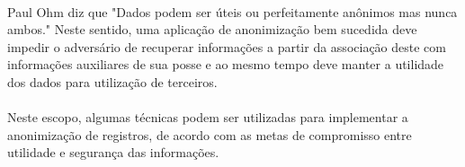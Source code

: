 \paragraph{} Paul Ohm\cite{ohm2009} diz que "Dados podem ser úteis ou perfeitamente anônimos mas nunca ambos." Neste sentido, uma aplicação de anonimização bem sucedida deve impedir o adversário de recuperar informações a partir da associação deste com informações auxiliares de sua posse e ao mesmo tempo deve manter a utilidade dos dados para utilização de terceiros. 

\paragraph{} Neste escopo, algumas técnicas podem ser utilizadas para implementar a anonimização de registros, de acordo com as metas de compromisso entre utilidade e segurança das informações.





